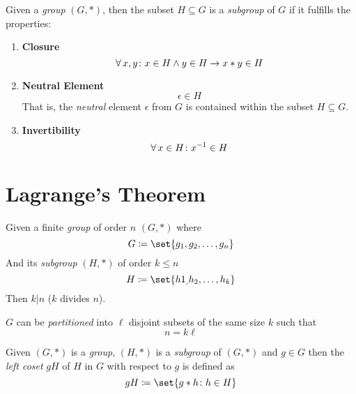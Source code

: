 \begin{definition}[Subgroup]
    Given a \textit{group} $(G, \ast)$, then the subset $H \subseteq G$ is a \textit{subgroup} of $G$ if it fulfills the properties:
    \begin{enumerate}
        \item \textbf{Closure}
        \begin{equation}
            \operatorname{\forall} x, y \colon x \in H \land y \in H \to x \ast y \in H
        \end{equation}
        \item \textbf{Neutral Element}
        \begin{equation}
            \epsilon \in H
        \end{equation}
        That is, the \textit{neutral} element $\epsilon$ from $G$ is contained within the subset $H \subseteq G$.
        \item \textbf{Invertibility}
        \begin{equation}
            \operatorname{\forall} x \in H \colon {x}^{-1} \in H
        \end{equation}
    \end{enumerate}
\end{definition}

\section{Lagrange's Theorem}

\begin{theorem}
    Given a finite \textit{group} of order $n$ $(G, \ast)$ where
    \begin{equation}
        G \coloneqq \set{ g_1, g_2, \dots, g_n }
    \end{equation}
    And its \textit{subgroup} $(H, \ast)$ of order $k \le n$
    \begin{equation}
        H \coloneqq \set{ h1_, h_2, \dots, h_k }
    \end{equation}
    Then $k \vert n$ ($k$ divides $n$).
    
    $G$ can be \textit{partitioned} into $\ell$ disjoint subsets of the same size $k$ such that
    \begin{equation}
        n = k \ell
    \end{equation}
\end{theorem}

\begin{definition}
    Given $(G, \ast)$ is a \textit{group}, $(H, \ast)$ is a \textit{subgroup} of $(G, \ast)$ and $g \in G$ then the \textit{left coset} $gH$ of $H$ in $G$ with respect to $g$ is defined as
    \begin{equation}
        gH \coloneqq \set{g \ast h \colon h \in H}
    \end{equation}
\end{definition}

